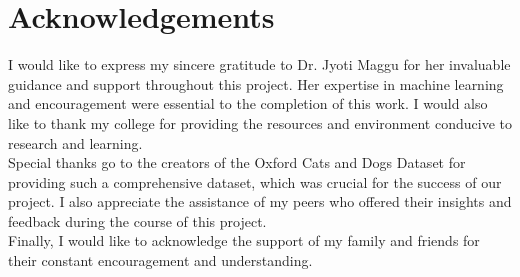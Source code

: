 \chapter*{\center \Large  Acknowledgements}
I would like to express my sincere gratitude to Dr. Jyoti Maggu for her invaluable guidance and support throughout this project. Her expertise in machine learning and encouragement were essential to the completion of this work. I would also like to thank my college for providing the resources and environment conducive to research and learning.\\[0.5cm]
\noindent
Special thanks go to the creators of the Oxford Cats and Dogs Dataset for providing such a comprehensive dataset, which was crucial for the success of our project. I also appreciate the assistance of my peers who offered their insights and feedback during the course of this project.\\[0.5cm]
Finally, I would like to acknowledge the support of my family and friends for their constant encouragement and understanding.

